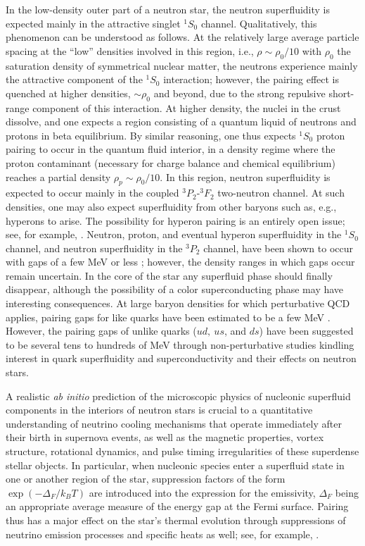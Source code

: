 \documentclass[rmp,aps,floatfix]{revtex4}
\begin{document}
In the low-density outer part of a neutron star, 
the neutron superfluidity is expected 
mainly in the attractive singlet $^1S_0$ channel. 
Qualitatively, this phenomenon can be understood
as follows.  At the relatively large average particle spacing at the 
``low'' densities involved in this region, i.e., $\rho \sim \rho_0/10$ 
with  $\rho_0$ the saturation density 
of symmetrical nuclear matter, 
the neutrons experience mainly the attractive component 
of the $^1S_0$ interaction;  however, the pairing effect is quenched 
at higher densities, $\sim \rho_0$ and beyond, due to the strong 
repulsive short-range component of this interaction.  
At higher density, the nuclei in the crust dissolve, and one 
expects a region consisting of a quantum liquid of neutrons and 
protons in beta equilibrium. 
By similar reasoning, one 
thus expects $^1S_0$ proton pairing to occur in the quantum fluid interior, 
in a density regime where the proton contaminant (necessary for
charge balance and chemical equilibrium) reaches a partial 
density $\rho_p \sim \rho_0/10$. 
In this region, neutron superfluidity is expected to  
occur mainly in the coupled $^3P_2$-$^3F_2$ two-neutron channel. 
At such densities, one may also expect superfluidity from 
other baryons such as, e.g., 
hyperons to arise. The possibility for hyperon pairing is an entirely open
issue; see, for example, \cite{barnea1996}.
Neutron, proton, and eventual hyperon superfluidity in the $^1S_0$
channel, and neutron  superfluidity in the $^3P_2$ channel, have been shown
to occur with gaps of a few MeV or less \cite{pair2};
however, the density ranges in which gaps occur remain
uncertain. 
In the core of the star any superfluid 
phase should finally disappear, although the possibility of a
color superconducting phase may have interesting consequences.
At large baryon densities for which perturbative QCD
applies, pairing gaps for like quarks have been estimated to be a few
MeV \cite{bailin84}.  However, the pairing gaps of unlike quarks ($ud,~
us$, and $ds$) have been suggested to be several tens to
hundreds of MeV through non-perturbative studies \cite{qsf0}
kindling interest in quark superfluidity and superconductivity
\cite{qsf} and their effects on
neutron stars.

A realistic {\it ab initio} prediction of the 
microscopic physics of nucleonic superfluid components in the interiors 
of neutron stars is crucial to a quantitative understanding of neutrino 
cooling mechanisms \cite{cooling1,cooling2,cooling3,nstar} 
that operate immediately after their birth 
in supernova events, as well as the magnetic properties, vortex structure, 
rotational dynamics, and pulse timing irregularities of these 
superdense stellar objects.  
In particular, when nucleonic species enter 
a superfluid state in one or another region of the star, suppression 
factors of the form $\exp (-\Delta_F /k_B T)$ are introduced 
into the expression for the emissivity, $\Delta_F$ being an appropriate 
average measure of the energy gap at the Fermi surface.  
Pairing thus has a major effect on the
star's thermal evolution through suppressions of neutrino
emission processes and specific heats as well; see, for example,
\cite{page2000}.  
\end{document}
